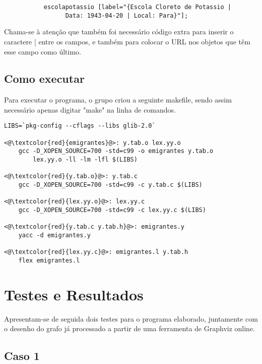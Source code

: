 \documentclass[a4paper]{article}
\begin{document}
\lstset{language=tex}
\begin{lstlisting}
           escolapotassio [label="{Escola Cloreto de Potassio | 
                 Data: 1943-04-20 | Local: Para}"];
\end{lstlisting}

\bigskip
\par Chama-se à atenção que também foi necessário código extra para inserir o caractere | entre os campos, e também para colocar o URL nos objetos que têm esse campo como último. 
\pagebreak
\subsection{Como executar}
\label{sec:3.4}
\hspace{3.5mm} Para executar o programa, o grupo criou a seguinte makefile, sendo assim necessário apenas digitar "make" na linha de comandos.

\bigskip
\lstset{language=C}
\begin{lstlisting}
LIBS=`pkg-config --cflags --libs glib-2.0`

<@\textcolor{red}{emigrantes}@>: y.tab.o lex.yy.o
	gcc -D_XOPEN_SOURCE=700 -std=c99 -o emigrantes y.tab.o 
	    lex.yy.o -ll -lm -lfl $(LIBS)

<@\textcolor{red}{y.tab.o}@>: y.tab.c
	gcc -D_XOPEN_SOURCE=700 -std=c99 -c y.tab.c $(LIBS)

<@\textcolor{red}{lex.yy.o}@>: lex.yy.c
	gcc -D_XOPEN_SOURCE=700 -std=c99 -c lex.yy.c $(LIBS)

<@\textcolor{red}{y.tab.c y.tab.h}@>: emigrantes.y
	yacc -d emigrantes.y

<@\textcolor{red}{lex.yy.c}@>: emigrantes.l y.tab.h
	flex emigrantes.l

\end{lstlisting}

\pagebreak
\section{Testes e Resultados}
\label{sec:4}
\hspace{3.5mm} Apresentam-se de seguida dois testes para o programa elaborado, juntamente com o desenho do grafo já processado a partir de uma ferramenta de Graphviz online\cite{webgraph}.


\subsection{Caso 1}
\label{sec:4.1}
\end{document}
